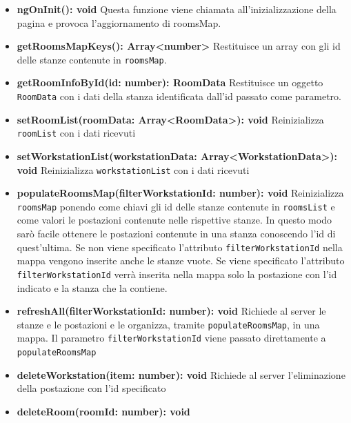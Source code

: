 \begin{itemize}
	\item \textbf{ngOnInit(): void} \newline
	Questa funzione viene chiamata all'inizializzazione della pagina e provoca l'aggiornamento di roomsMap.
	\item \textbf{getRoomsMapKeys(): Array<number>} \newline
	Restituisce un array con gli id delle stanze contenute in \texttt{roomsMap}.
	\item \textbf{getRoomInfoById(id: number): RoomData} \newline
	Restituisce un oggetto \texttt{RoomData} con i dati della stanza identificata dall'id passato come parametro.
	\item \textbf{setRoomList(roomData: Array<RoomData>): void} \newline
	Reinizializza \texttt{roomList} con i dati ricevuti
	\item \textbf{setWorkstationList(workstationData: Array<WorkstationData>): void} \newline
	Reinizializza \texttt{workstationList} con i dati ricevuti
	\item \textbf{populateRoomsMap(filterWorkstationId: number): void} \newline
	Reinizializza \texttt{roomsMap} ponendo come chiavi gli id delle stanze contenute in \texttt{roomsList} e come valori le postazioni contenute nelle rispettive stanze. In questo modo sarò facile ottenere le postazioni contenute in una stanza conoscendo l'id di quest'ultima. \newline
	Se non viene specificato l'attributo \texttt{filterWorkstationId} nella mappa vengono inserite anche le stanze vuote. \newline
	Se viene specificato l'attributo \texttt{filterWorkstationId} verrà inserita nella mappa solo la postazione con l'id indicato e la stanza che la contiene.
	\item \textbf{refreshAll(filterWorkstationId: number): void} \newline
	Richiede al server le stanze e le postazioni e le organizza, tramite \texttt{populateRoomsMap}, in una mappa. Il parametro \texttt{filterWorkstationId} viene passato direttamente a \texttt{populateRoomsMap}
	\item \textbf{deleteWorkstation(item: number): void} \newline
	Richiede al server l'eliminazione della postazione con l'id specificato
	\item \textbf{deleteRoom(roomId: number): void} \newline

\end{itemize}
